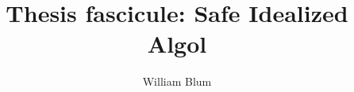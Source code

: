 

\author{William Blum}
\title{Thesis fascicule: Safe Idealized Algol}


    \maketitle
    \tableofcontents

    

    
    


